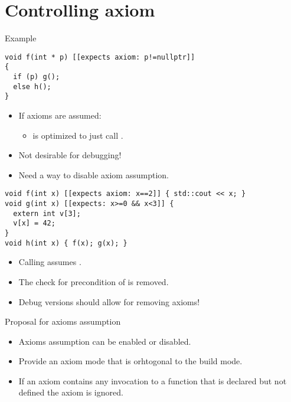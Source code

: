 \section{Controlling axiom}

\begin{frame}[t,fragile]{Example}
\begin{block}{}
\begin{lstlisting}
void f(int * p) [[expects axiom: p!=nullptr]]
{
  if (p) g();
  else h();
}
\end{lstlisting}
\end{block}

\begin{itemize}
  \item If axioms are assumed:
    \begin{itemize}
      \item {} is optimized to just call .
    \end{itemize}
  \item Not desirable for debugging!
  \item Need a way to disable axiom assumption.
\end{itemize}
\end{frame}

\begin{frame}[t,fragile]
\begin{block}{}
\begin{lstlisting}
void f(int x) [[expects axiom: x==2]] { std::cout << x; }
void g(int x) [[expects: x>=0 && x<3]] {
  extern int v[3];
  v[x] = 42;
}
void h(int x) { f(x); g(x); }
\end{lstlisting}
\end{block}
\begin{itemize}
  \item Calling  assumes .
  \item The check for precondition of  is removed.
  \item Debug versions should allow for removing axioms!
\end{itemize}
\end{frame}

\begin{frame}[t]{Proposal for axioms assumption}
\begin{itemize}
\item Axioms assumption can be enabled or disabled.
\item Provide an axiom mode that is orhtogonal to the build mode.
\item If an axiom contains any invocation to a function that is declared
      but not defined the axiom is ignored. 
\end{itemize}
\end{frame}
